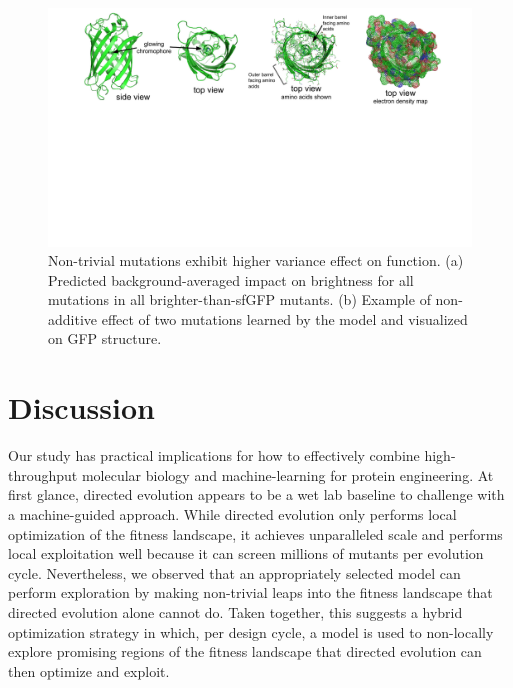 \begin{figure}
  \includegraphics[width=1\linewidth,page=5,trim={0cm 9cm 0cm 0}]{figures/2018-05-09-NIPS_2018_Figures.pdf}
  \caption{\small{
    Non-trivial mutations exhibit higher variance effect on function. (a) Predicted background-averaged impact on brightness for all mutations in all brighter-than-sfGFP mutants. (b) Example of non-additive effect of two mutations learned by the model and visualized on GFP structure.}
  }
  \label{non-trivial-variance}
  \vspace{-0.6cm}
\end{figure}

\vspace{-3mm}
\section{Discussion}

Our study has practical implications for how to effectively combine high-throughput molecular biology and machine-learning for protein engineering. At first glance, directed evolution appears to be a wet lab baseline to challenge with a machine-guided approach. While directed evolution only performs local optimization of the fitness landscape, it achieves unparalleled scale and performs local exploitation well because it can screen millions of mutants per evolution cycle. Nevertheless, we observed that an appropriately selected model can perform exploration by making non-trivial leaps into the fitness landscape that directed evolution alone cannot do. Taken together, this suggests a hybrid optimization strategy in which, per design cycle, a model is used to non-locally explore promising regions of the fitness landscape that directed evolution can then optimize and exploit.

